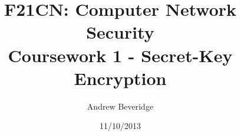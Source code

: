 %
%
% 
%
\begin{titlepage}
\title{F21CN: Computer Network Security \\\Large{Coursework 1 - Secret-Key Encryption}}
\author{
	Andrew Beveridge\\
}
\date{11/10/2013}
\maketitle
\thispagestyle{empty}
\end{titlepage}
